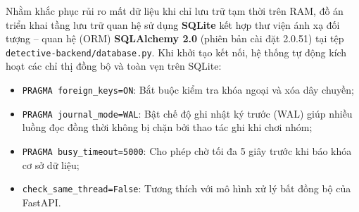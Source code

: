 Nhằm khắc phục rủi ro mất dữ liệu khi chỉ lưu trữ tạm thời trên RAM, đồ án triển khai tầng lưu trữ quan hệ sử dụng \textbf{SQLite} kết hợp thư viện ánh xạ đối tượng -- quan hệ (ORM) \textbf{SQLAlchemy 2.0} (phiên bản cài đặt 2.0.51) tại tệp \texttt{detective-backend/database.py}. Khi khởi tạo kết nối, hệ thống tự động kích hoạt các chỉ thị đồng bộ và toàn vẹn trên SQLite:
\begin{itemize}[leftmargin=1.5cm]
    \item \texttt{PRAGMA foreign\_keys=ON}: Bắt buộc kiểm tra khóa ngoại và xóa dây chuyền;
    \item \texttt{PRAGMA journal\_mode=WAL}: Bật chế độ ghi nhật ký trước (WAL) giúp nhiều luồng đọc đồng thời không bị chặn bởi thao tác ghi khi chơi nhóm;
    \item \texttt{PRAGMA busy\_timeout=5000}: Cho phép chờ tối đa 5 giây trước khi báo khóa cơ sở dữ liệu;
    \item \texttt{check\_same\_thread=False}: Tương thích với mô hình xử lý bất đồng bộ của FastAPI.
\end{itemize}

